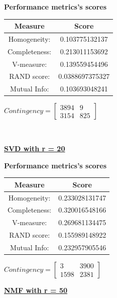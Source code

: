 \documentclass{article}
\begin{document}
\begin{center}
	\textbf{Performance metrics's scores} \\ \vspace{10pt}
	\begin{tabular}{*{2}{c}} 
		\toprule
		\textbf{Measure} & \textbf{Score} \\	
		\midrule
		Homogeneity: & 0.103775132137 \\
		\midrule
		Completeness: & 0.213011153692 \\
		\midrule
		V-measure: 	& 0.139559454496 \\
		\midrule
		RAND score: & 0.0388697375327 \\
		\midrule
		Mutual Info: & 0.103693048241 \\
		\bottomrule
	\end{tabular}
	\qquad	
	$Contingency = \left[\begin{array}{*{2}{c}}
		3894  & 9 \\
		3154  & 825 
		\end{array}\right]
	$
\end{center}

\\ \vspace{20pt}

\underline{\textbf{SVD with r = 20}} 

\begin{center}
	\textbf{Performance metrics's scores} \\ \vspace{10pt}
	\begin{tabular}{*{2}{c}}
		\toprule
		\textbf{Measure} & \textbf{Score} \\
		\midrule
		Homogeneity: & 0.233028131747 \\
		\midrule
		Completeness: & 0.320016548166 \\
		\midrule
		V-measure: 	& 0.269681134475 \\
		\midrule
		RAND score: & 0.155989148922 \\
		\midrule
		Mutual Info: & 0.232957905546 \\
		\bottomrule
	\end{tabular}
	\qquad
	$Contingency = \left[ \begin{array}{*{2}{c}}
		3 		& 3900 \\
		1598 	& 2381 
			\end{array}\right]
			$
\end{center}
\newpage

\underline{\textbf{NMF with r = 50}} 
\end{document}

